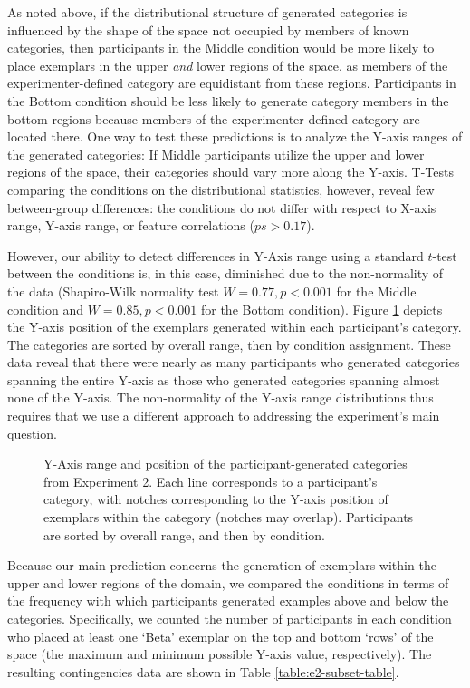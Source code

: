 \documentclass[12pt]{article}
\newcommand\inputpgf[2]{{
\let\pgfimageWithoutPath\pgfimage
\renewcommand{\pgfimage}[2][]{\pgfimageWithoutPath[##1]{#1/##2}}

}}
\begin{document}
\begin{flushleft}
As noted above, if the distributional structure of generated categories is influenced by the shape of the space not occupied by members of known categories, then participants in the Middle condition would be more likely to place exemplars in the upper {\em and} lower regions of the space, as members of the experimenter-defined category are equidistant from these regions. Participants in the Bottom condition should be less likely to generate category members in the bottom regions because members of the experimenter-defined category are located there. One way to test these predictions is to analyze the Y-axis ranges of the generated categories: If Middle participants utilize the upper and lower regions of the space, their categories should vary more along the Y-axis. T-Tests comparing the conditions on the distributional statistics, however, reveal few between-group differences: the conditions do not differ with respect to X-axis range, Y-axis range, or feature correlations ($ps>0.17$).

However, our ability to detect differences in Y-Axis range using a standard $t$-test between the conditions is, in this case, diminished due to the non-normality of the data (Shapiro-Wilk normality test $W=0.77, p< 0.001$ for the Middle condition and $W=0.85, p < 0.001$ for the Bottom condition). Figure \ref{fig:e2-yranges} depicts the Y-axis position of the exemplars generated within each participant's category. The categories are sorted by overall range, then by condition assignment. These data reveal that there were nearly as many participants who generated categories spanning the entire Y-axis as those who generated categories spanning almost none of the Y-axis. The non-normality of the Y-axis range distributions thus requires that we use a different approach to addressing the experiment's main question.

\begin{figure}
    \begin{center}
    \inputpgf{figs/}{e2-yranges.pgf}
    \caption{Y-Axis range and position of the participant-generated categories from Experiment 2. Each line corresponds to a participant's category, with notches corresponding to the Y-axis position of exemplars within the category (notches may overlap). Participants are sorted by overall range, and then by condition. }
    \label{fig:e2-yranges}
    \end{center}
\end{figure}

Because our main prediction concerns the generation of exemplars within the upper and lower regions of the domain, we compared the conditions in terms of the frequency with which participants generated examples above and below the categories. Specifically, we counted the number of participants in each condition who placed at least one `Beta' exemplar on the top and bottom `rows' of the space (the maximum and minimum possible Y-axis value, respectively). The resulting contingencies data are shown in Table \ref{table:e2-subset-table}. 


\end{flushleft}
\end{document}
